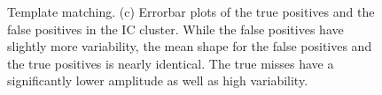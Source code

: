\begin{center}
\begin{figure}
\begin{subfigure}[b]{.33\textwidth}
\caption{}
\label{fig:ICold}
\end{subfigure}
\caption{Template matching.
(c) Errorbar plots of the true positives and the false positives in the IC cluster.  While the false positives have slightly more variability, the mean shape for the false positives and the true positives is nearly identical.  The true misses have a significantly lower amplitude as well as high variability. 
} \label{fig:IC-PCA}
\end{figure}
\end{center}



% 
% 
% 
% 
% 
% 
% 
% 
% 
% 
% 
